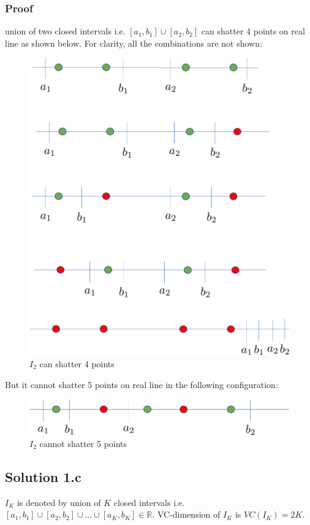 \subsubsection*{Proof}
union of two closed intervals i.e. $[a_1, b_1] \cup [a_2, b_2]$ can shatter 4 points on real line as shown below. For clarity, all the combinations are not shown:
\begin{figure}[h!]
	\centering
	\includegraphics[scale=0.4]{q1_b}
	\caption{$I_2$ can shatter 4 points}
\end{figure}
\newpage
But it cannot shatter 5 points on real line in the following configuration:
\begin{figure}[h!]
	\centering
	\includegraphics[scale=0.5]{q1_b_proof}
	\caption{$I_2$ cannot shatter 5 points}
\end{figure}
\subsection*{Solution 1.c}
$I_K$ is denoted by union of $K$ closed intervals i.e. $[a_1, b_1] \cup [a_2, b_2] \cup \ldots \cup [a_K, b_K] \in \mathbb{R}$. VC-dimension of $I_K$ is $VC(I_K) = 2K$.
